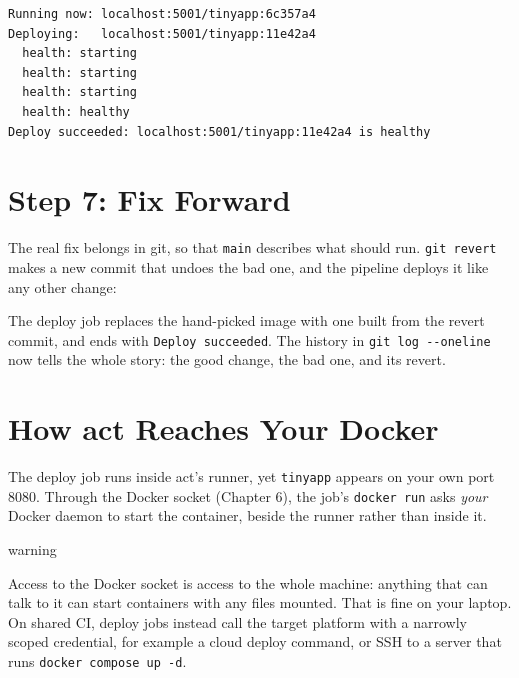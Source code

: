 \begin{codeblock}
\begin{Verbatim}[formatcom=\outputstyle]
Running now: localhost:5001/tinyapp:6c357a4
Deploying:   localhost:5001/tinyapp:11e42a4
  health: starting
  health: starting
  health: starting
  health: healthy
Deploy succeeded: localhost:5001/tinyapp:11e42a4 is healthy
\end{Verbatim}
\end{codeblock}


\section{Step 7: Fix Forward}\label{10-lab-deploy-on-every-push:step-7-fix-forward}

The real fix belongs in git, so that \texttt{main} describes what should run. \texttt{git\ revert} makes a new commit that undoes the bad one, and the pipeline deploys it like any other change:

\begin{codeblock}

\begin{Shaded}
\begin{Highlighting}[]
\end{Highlighting}
\end{Shaded}

\end{codeblock}

The deploy job replaces the hand-picked image with one built from the revert commit, and ends with \texttt{Deploy\ succeeded}. The history in \texttt{git\ log\ -\/-oneline} now tells the whole story: the good change, the bad one, and its revert.

\section{How act Reaches Your Docker}\label{10-lab-deploy-on-every-push:how-act-reaches-your-docker}

The deploy job runs inside act's runner, yet \texttt{tinyapp} appears on your own port 8080. Through the Docker socket (Chapter 6), the job's \texttt{docker\ run} asks \emph{your} Docker daemon to start the container, beside the runner rather than inside it.

\begin{callout}{warning}

Access to the Docker socket is access to the whole machine: anything that can talk to it can start containers with any files mounted. That is fine on your laptop. On shared CI, deploy jobs instead call the target platform with a narrowly scoped credential, for example a cloud deploy command, or SSH to a server that runs \texttt{docker\ compose\ up\ -d}.

\end{callout}

